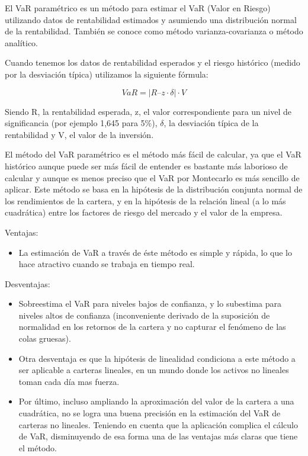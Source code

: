 \documentclass[
  12pt,
]{krantz}
\providecommand{\tightlist}{%
  \setlength{\itemsep}{0pt}\setlength{\parskip}{0pt}}
\begin{document}
El VaR paramétrico es un método para estimar el VaR (Valor en Riesgo) utilizando datos de rentabilidad estimados y asumiendo una distribución normal de la rentabilidad. También se conoce como método varianza-covarianza o método analítico.

Cuando tenemos los datos de rentabilidad esperados y el riesgo histórico (medido por la desviación típica) utilizamos la siguiente fórmula:

\[VaR = |R – z·\delta|· V\]

Siendo R, la rentabilidad esperada, z, el valor correspondiente para un nivel de significancia (por ejemplo 1,645 para 5\%), \(\delta\), la desviación típica de la rentabilidad y V, el valor de la inversión.

El método del VaR paramétrico es el método más fácil de calcular, ya que el VaR histórico aunque puede ser más fácil de entender es bastante más laborioso de calcular y aunque es menos preciso que el VaR por Montecarlo es más sencillo de aplicar. Este método se basa en la hipótesis de la distribución conjunta normal de los rendimientos de la cartera, y en la hipótesis de la relación lineal (a lo más cuadrática) entre los factores de riesgo del mercado y el valor de la empresa.

Ventajas:

\begin{itemize}
\tightlist
\item
  La estimación de VaR a través de éste método es simple y rápida, lo que lo hace atractivo cuando se trabaja en tiempo real.
\end{itemize}

Desventajas:

\begin{itemize}
\tightlist
\item
  Sobreestima el VaR para niveles bajos de confianza, y lo subestima para niveles altos de confianza (inconveniente derivado de la suposición de normalidad en los retornos de la cartera y no capturar el fenómeno de las colas gruesas).
\item
  Otra desventaja es que la hipótesis de linealidad condiciona a este método a ser aplicable a carteras lineales, en un mundo donde los activos no lineales toman cada día mas fuerza.
\item
  Por último, incluso ampliando la aproximación del valor de la cartera a una cuadrática, no se logra una buena precisión en la estimación del VaR de carteras no lineales. Teniendo en cuenta que la aplicación complica el cálculo de VaR, disminuyendo de esa forma una de las ventajas más claras que tiene el método.
\end{itemize}
\end{document}
